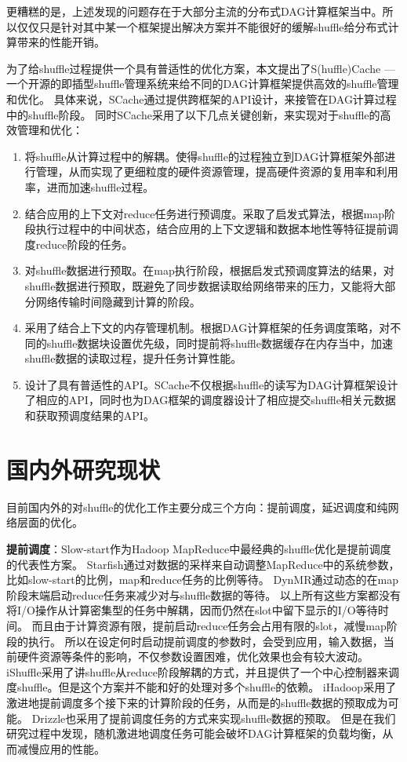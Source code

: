 更糟糕的是，上述发现的问题存在于大部分主流的分布式DAG计算框架当中。所以仅仅只是针对其中某一个框架提出解决方案并不能很好的缓解shuffle给分布式计算带来的性能开销。

为了给shuffle过程提供一个具有普适性的优化方案，本文提出了S(huffle)Cache --- 一个开源的即插型shuffle管理系统来给不同的DAG计算框架提供高效的shuffle管理和优化。
具体来说，SCache通过提供跨框架的API设计，来接管在DAG计算过程中的shuffle阶段。
同时SCache采用了以下几点关键创新，来实现对于shuffle的高效管理和优化：

\begin{enumerate}
	\item 将shuffle从计算过程中的解耦。使得shuffle的过程独立到DAG计算框架外部进行管理，从而实现了更细粒度的硬件资源管理，提高硬件资源的复用率和利用率，进而加速shuffle过程。
	\item 结合应用的上下文对reduce任务进行预调度。采取了启发式算法，根据map阶段执行过程中的中间状态，结合应用的上下文逻辑和数据本地性等特征提前调度reduce阶段的任务。
	\item 对shuffle数据进行预取。在map执行阶段，根据启发式预调度算法的结果，对shuffle数据进行预取，既避免了同步数据读取给网络带来的压力，又能将大部分网络传输时间隐藏到计算的阶段。
	\item 采用了结合上下文的内存管理机制。根据DAG计算框架的任务调度策略，对不同的shuffle数据块设置优先级，同时提前将shuffle数据缓存在内存当中，加速shuffle数据的读取过程，提升任务计算性能。
	\item 设计了具有普适性的API。SCache不仅根据shuffle的读写为DAG计算框架设计了相应的API，同时也为DAG框架的调度器设计了相应提交shuffle相关元数据和获取预调度结果的API。
\end{enumerate}

\section{国内外研究现状}
\label{sec:relatedwork}

目前国内外的对shuffle的优化工作主要分成三个方向：提前调度，延迟调度和纯网络层面的优化。

\textbf{提前调度}：Slow-start作为Hadoop MapReduce\cite{hadoop}中最经典的shuffle优化是提前调度的代表性方案。
Starfish\cite{starfish}通过对数据的采样来自动调整MapReduce中的系统参数，比如slow-start的比例，map和reduce任务的比例等待。
DynMR\cite{dynmr}通过动态的在map阶段末端启动reduce任务来减少对与shuffle数据的等待。
以上所有这些方案都没有将I/O操作从计算密集型的任务中解耦，因而仍然在slot中留下显示的I/O等待时间。
而且由于计算资源有限，提前启动reduce任务会占用有限的slot，减慢map阶段的执行。
所以在设定何时启动提前调度的参数时，会受到应用，输入数据，当前硬件资源等条件的影响，不仅参数设置困难，优化效果也会有较大波动。
iShuffle\cite{ishuffle}采用了讲shuffle从reduce阶段解耦的方式，并且提供了一个中心控制器来调度shuffle。但是这个方案并不能和好的处理对多个shuffle的依赖。
iHadoop\cite{ihadoop}采用了激进地提前调度多个接下来的计算阶段的任务，从而是的shuffle数据的预取成为可能。
Drizzle\cite{drizzle}也采用了提前调度任务的方式来实现shuffle数据的预取。
但是在我们研究过程中发现，随机激进地调度任务可能会破坏DAG计算框架的负载均衡，从而减慢应用的性能。

